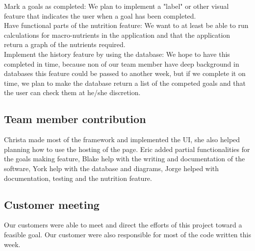 \documentclass[a4paper]{article}
\begin{document}
\noindent Mark a goals as completed: We plan to implement a "label" or other visual feature that indicates the user when a goal has been completed.\\

\noindent Have functional parts of the nutrition feature: We want to at least be able to run calculations for macro-nutrients in the application and that the application return a graph of the nutrients required.\\

\noindent Implement the history feature by using the database: We hope to have this completed in time, because non of our team member have deep background in databases this feature could be passed to another week, but if we complete it on time, we plan to make the database return a list of the competed goals  and that the user can check them at he/she discretion.\\

\subsection{Team member contribution}

Christa made most of the framework and implemented the UI, she also helped planning how to use the hosting  of the page. Eric added partial functionalities for the goals making feature, Blake help with the writing and documentation of the software, York help with the  database and diagrams, Jorge helped with documentation, testing and the nutrition feature.\\

\subsection{Customer meeting }
Our customers were able to meet and direct the efforts of this project toward a feasible goal. Our customer were also responsible for most of the code written this week.
\end{document}
